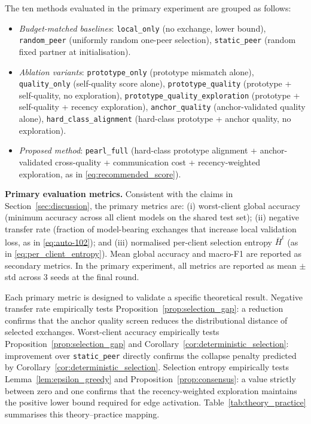 \documentclass[conference]{IEEEtran}
\begin{document}
The ten methods evaluated in the primary experiment are grouped as follows:
\begin{itemize}
    \item \emph{Budget-matched baselines}: \texttt{local\_only} (no exchange, lower bound), \texttt{random\_peer} (uniformly random one-peer selection), \texttt{static\_peer} (random fixed partner at initialisation).
    \item \emph{Ablation variants}: \texttt{prototype\_only} (prototype mismatch alone), \texttt{quality\_only} (self-quality score alone), \texttt{prototype\_quality} (prototype + self-quality, no exploration), \texttt{prototype\_quality\_exploration} (prototype + self-quality + recency exploration), \texttt{anchor\_quality} (anchor-validated quality alone), \texttt{hard\_class\_alignment} (hard-class prototype + anchor quality, no exploration).
    \item \emph{Proposed method}: \texttt{pearl\_full} (hard-class prototype alignment + anchor-validated cross-quality + communication cost + recency-weighted exploration, as in \eqref{eq:recommended_score}).
\end{itemize}

\textbf{Primary evaluation metrics.}
Consistent with the claims in Section~\ref{sec:discussion}, the primary metrics are: (i) worst-client global accuracy (minimum accuracy across all client models on the shared test set); (ii) negative transfer rate (fraction of model-bearing exchanges that increase local validation loss, as in \eqref{eq:auto-102}); and (iii) normalised per-client selection entropy $\bar{H}^t$ (as in \eqref{eq:per_client_entropy}). Mean global accuracy and macro-F1 are reported as secondary metrics. In the primary experiment, all metrics are reported as mean $\pm$ std across 3 seeds at the final round.

Each primary metric is designed to validate a specific theoretical result. Negative transfer rate empirically tests Proposition~\ref{prop:selection_gap}: a reduction confirms that the anchor quality screen reduces the distributional distance of selected exchanges. Worst-client accuracy empirically tests Proposition~\ref{prop:selection_gap} and Corollary~\ref{cor:deterministic_selection}: improvement over \texttt{static\_peer} directly confirms the collapse penalty predicted by Corollary~\ref{cor:deterministic_selection}. Selection entropy empirically tests Lemma~\ref{lem:epsilon_greedy} and Proposition~\ref{prop:consensus}: a value strictly between zero and one confirms that the recency-weighted exploration maintains the positive lower bound required for edge activation. Table~\ref{tab:theory_practice} summarises this theory--practice mapping.
\end{document}
